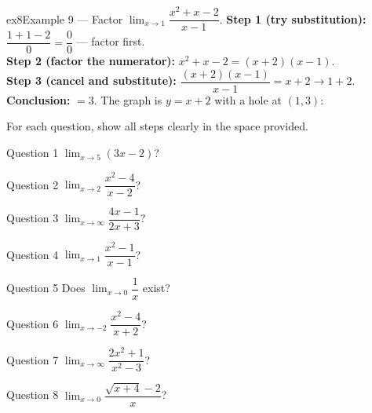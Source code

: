 \documentclass[11pt]{article}
\begin{document}
\begin{example}{ex8}{Example 9 --- Factor}
$\displaystyle\lim_{x\to1}\dfrac{x^2+x-2}{x-1}$.\soln
\textbf{Step 1 (try substitution):} $\dfrac{1+1-2}{0}=\dfrac00$ --- factor first.\\[3pt]
\textbf{Step 2 (factor the numerator):} $x^2+x-2=(x+2)(x-1)$.\\[3pt]
\textbf{Step 3 (cancel and substitute):} $\dfrac{(x+2)(x-1)}{x-1}=x+2\to1+2$.\\[3pt]
\textbf{Conclusion:} $=3$. The graph is $y=x+2$ with a hole at $(1,3)$:
\end{example}

\clearpage
{}
For each question, show all steps clearly in the space provided.

\begin{qbox}{Question 1}
$\displaystyle\lim_{x\to5}(3x-2)$?\workspace{2.4cm}
\end{qbox}

\begin{qbox}{Question 2}
$\displaystyle\lim_{x\to2}\dfrac{x^2-4}{x-2}$?\workspace{2.4cm}
\end{qbox}

\begin{qbox}{Question 3}
$\displaystyle\lim_{x\to\infty}\dfrac{4x-1}{2x+3}$?\workspace{2.4cm}
\end{qbox}

\begin{qbox}{Question 4}
$\displaystyle\lim_{x\to1}\dfrac{x^2-1}{x-1}$?\workspace{2.4cm}
\end{qbox}

\begin{qbox}{Question 5}
Does $\displaystyle\lim_{x\to0}\dfrac1x$ exist?\workspace{2.4cm}
\end{qbox}

\begin{qbox}{Question 6}
$\displaystyle\lim_{x\to-2}\dfrac{x^2-4}{x+2}$?\workspace{2.4cm}
\end{qbox}

\begin{qbox}{Question 7}
$\displaystyle\lim_{x\to\infty}\dfrac{2x^2+1}{x^2-3}$?\workspace{2.4cm}
\end{qbox}

\begin{qbox}{Question 8}
$\displaystyle\lim_{x\to0}\dfrac{\sqrt{x+4}-2}{x}$?\workspace{2.4cm}
\end{qbox}
\end{document}
